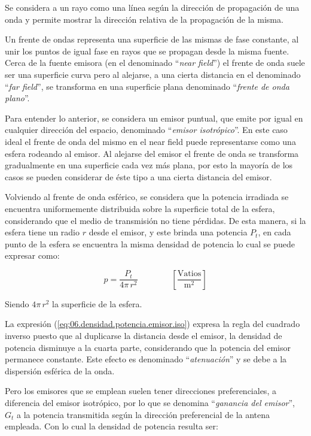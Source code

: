 Se considera a un rayo como una línea seg\'un la dirección de
propagación de una onda y permite mostrar la
dirección relativa de la propagación de la misma.

Un frente de ondas representa una superficie de las mismas de fase
constante, al unir los puntos de igual fase en rayos
que se propagan desde la misma fuente. Cerca de la fuente emisora (en el denominado ``\emph{near field}'')
el frente de onda suele ser una superficie curva pero al alejarse, a una cierta distancia en el denominado ``\emph{far field}'', se transforma en una superficie plana denominado ``\emph{frente de onda plano}''.

Para entender lo anterior, se considera un emisor puntual, que emite por igual en cualquier direcci\'on del espacio,  denominado ``\emph{emisor isotr\'opico}''. En este caso ideal 
el frente de onda del mismo en el near field
puede representarse como una esfera rodeando al emisor.
Al alejarse del emisor el frente de onda se transforma gradualmente en una superficie cada vez m\'as plana,
por esto la mayor\'ia de los casos se pueden considerar de \'este tipo a una cierta distancia del emisor.

Volviendo al frente de onda esf\'erico, se considera que la potencia irradiada se encuentra 
uniformemente distribuida sobre la superficie total de la esfera, considerando que el medio de transmisión no
tiene pérdidas.
De esta manera, si la esfera tiene un radio $r$ desde el emisor, y este brinda una potencia $P_t$, 
 en cada punto de la esfera se encuentra la misma densidad de potencia lo cual se puede expresar como:

 \begin{equation}
   \label{eq:06.densidad.potencia.emisor.iso} \displaystyle
   p = \frac{P_t}{4\pi\,r^2} \qquad \qquad  \left[ \frac{\text{Vatios}}{\text{m}^2} \right]
 \end{equation}

Siendo $4\pi\,r^2$ la superficie de la esfera.

La expresi\'on (\ref{eq:06.densidad.potencia.emisor.iso})
expresa la regla del cuadrado inverso puesto que al duplicarse la distancia desde el emisor,
la densidad de potencia disminuye a la cuarta parte, considerando que la potencia del emisor
permanece constante.
Este efecto es denominado ``\emph{atenuaci\'on}'' y se debe a la dispersión esférica de la onda.

Pero los emisores que se emplean suelen tener direcciones preferenciales, a diferencia del emisor isotr\'opico,
por lo que 
se denomina ``\emph{ganancia del emisor}'', $G_t$ a la potencia transmitida seg\'un la 
direcci\'on preferencial de la antena empleada. Con lo cual la densidad de potencia resulta ser:

